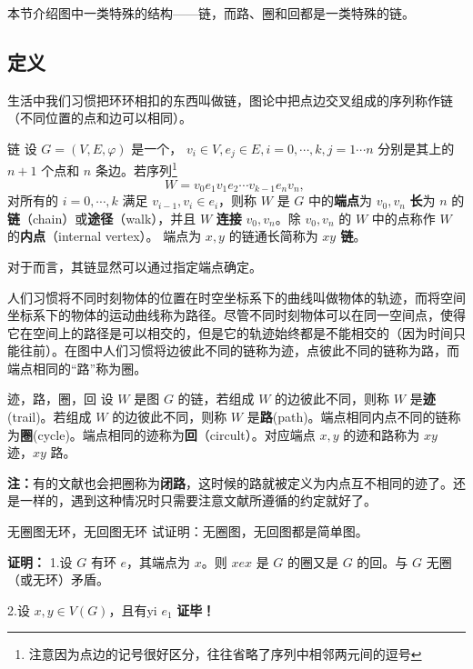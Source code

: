 
本节介绍图中一类特殊的结构——链，而路、圈和回都是一类特殊的链。

\subsection{定义}
生活中我们习惯把环环相扣的东西叫做链，图论中把点边交叉组成的序列称作链（不同位置的点和边可以相同）。

\begin{definition}{链}
设 $G=(V,E,\varphi)$ 是一个， $v_i\in V,e_j\in E,i=0,\cdots,k,j=1\cdots n$ 分别是其上的 $n+1$ 个点和 $n$ 条边。若序列\footnote{注意因为点边的记号很好区分，往往省略了序列中相邻两元间的逗号}
\begin{equation}
W=v_0 e_1v_1e_2\cdots v_{k-1} e_nv_n,~
\end{equation}
对所有的 $i=0,\cdots,k$ 满足 $v_{i-1},v_{i}\in e_{i}$，则称 $W$ 是 $G$ 中的\textbf{端点}为 $v_0,v_n$ \textbf{长}为 $n$ 的\textbf{链}（chain）或\textbf{途径}（walk），并且 $W$ \textbf{连接} $v_0,v_n$。除 $v_0,v_n$ 的 $W$ 中的点称作 $W$ 的\textbf{内点}（internal vertex）。 端点为 $x,y$ 的链通长简称为 \textbf{$xy$ 链}。
\end{definition}
对于而言，其链显然可以通过指定端点确定。

人们习惯将不同时刻物体的位置在时空坐标系下的曲线叫做物体的轨迹，而将空间坐标系下的物体的运动曲线称为路径。尽管不同时刻物体可以在同一空间点，使得它在空间上的路径是可以相交的，但是它的轨迹始终都是不能相交的（因为时间只能往前）。在图中人们习惯将边彼此不同的链称为迹，点彼此不同的链称为路，而端点相同的“路”称为圈。
\begin{definition}{迹，路，圈，回}\label{def_PatCyc_2}
设 $W$ 是图 $G$ 的链，若组成 $W$ 的边彼此不同，则称 $W$ 是\textbf{迹}(trail)。若组成 $W$ 的边彼此不同，则称 $W$ 是\textbf{路}(path)。端点相同内点不同的链称为\textbf{圈}(cycle)。端点相同的迹称为\textbf{回}（circult）。对应端点 $x,y$ 的迹和路称为 $xy$ 迹，$xy$ 路。
\end{definition}
\textbf{注：}有的文献也会把圈称为\textbf{闭路}，这时候的路就被定义为内点互不相同的迹了。还是一样的，遇到这种情况时只需要注意文献所遵循的约定就好了。

\begin{example}{无圈图无环，无回图无环}\label{ex_PatCyc_1}
试证明：无圈图，无回图都是简单图。

\textbf{证明：}
1.设 $G$ 有环 $e$，其端点为 $x$。则 $xex$ 是 $G$ 的圈又是 $G$ 的回。与 $G$ 无圈（或无环）矛盾。

2.设 $x,y\in V(G)$，且有yi $e_1$ 
\textbf{证毕！}
\end{example}


